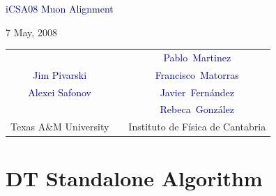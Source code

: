 \documentclass[compress]{beamer}
\begin{document}
\begin{frame}
\begin{center}
\vfill \textcolor{darkblue}{\LARGE iCSA08 Muon Alignment}

\vspace{0.5 cm} \small 7 May, 2008

\vfill \renewcommand{\arraystretch}{1.5} \begin{tabular}{c c c}
\textcolor{darkblue}{} & & \textcolor{darkblue}{Pablo Martinez} \\
\textcolor{darkblue}{Jim Pivarski} & & \textcolor{darkblue}{Francisco Matorras} \\
\textcolor{darkblue}{Alexei Safonov} & & \textcolor{darkblue}{Javier Fern\'andez} \\
\textcolor{darkblue}{} & & \textcolor{darkblue}{Rebeca Gonz\'alez} \\
\small Texas A\&M University & & \small Instituto de F\'isica de Cantabria
\end{tabular}

\end{center}
\end{frame}



\section*{DT Standalone Algorithm}
\end{document}
